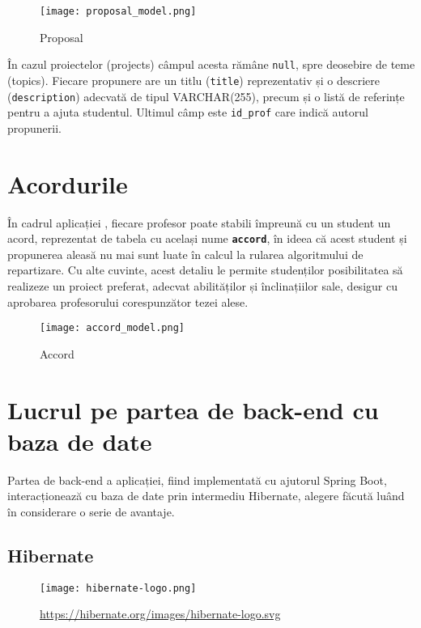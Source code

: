 \begin{figure}[H]
	\centering
	\texttt{[image: proposal\_model.png]}
	\caption{Proposal}
\end{figure}

În cazul proiectelor (projects) câmpul acesta rămâne \texttt{null}, spre deosebire de teme (topics). Fiecare propunere are un titlu (\texttt{title}) reprezentativ și o descriere (\texttt{description}) adecvată de tipul VARCHAR(255), precum și o listă de referințe pentru a ajuta studentul. Ultimul câmp este \texttt{id\_prof} care indică autorul propunerii.


\section{Acordurile}

În cadrul aplicației \thesistitle, fiecare profesor poate stabili împreună cu un student un acord, reprezentat de tabela cu același nume \textbf{\texttt{accord}}, în ideea că acest student și propunerea aleasă nu mai sunt luate în calcul la rularea algoritmului de repartizare. Cu alte cuvinte, acest detaliu le permite studenților posibilitatea să realizeze un proiect preferat, adecvat abilităților și înclinațiilor sale, desigur cu aprobarea profesorului corespunzător tezei alese.

\begin{figure}[H]
	\centering
	\texttt{[image: accord\_model.png]}
	\caption{Accord}
\end{figure}

\section{Lucrul pe partea de back-end cu baza de date}

Partea de back-end a aplicației, fiind implementată cu ajutorul Spring Boot, interacționează cu baza de date prin intermediu Hibernate, alegere făcută luând în considerare o serie de avantaje.

\subsection{Hibernate}

\begin{figure}[H]
	\texttt{[image: hibernate-logo.png]}
	\caption{\url{https://hibernate.org/images/hibernate-logo.svg}}
\end{figure}

